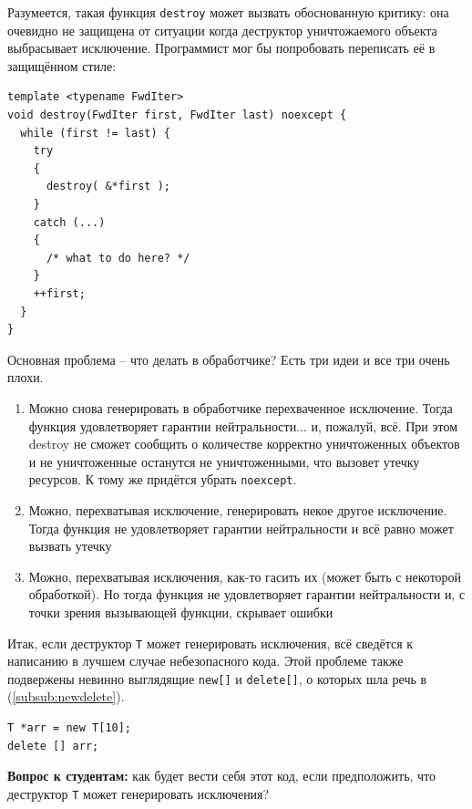 \documentclass[a4paper,12pt,oneside]{book}
\newif\ifanswers
\begin{document}
Разумеется, такая функция \lstinline!destroy! может вызвать обоснованную критику: она очевидно не защищена от ситуации когда деструктор уничтожаемого объекта выбрасывает исключение. Программист мог бы попробовать переписать её в защищённом стиле:

\begin{lstlisting}
template <typename FwdIter>
void destroy(FwdIter first, FwdIter last) noexcept {
  while (first != last) {
    try 
    {
      destroy( &*first ); 
    }
    catch (...)
    {
      /* what to do here? */
    }
    ++first;
  }
}
\end{lstlisting}

Основная проблема -- что делать в обработчике? Есть три идеи и все три очень плохи.
\begin{enumerate}
\item
Можно снова генерировать в обработчике перехваченное исключение. Тогда функция удовлетворяет гарантии нейтральности... и, пожалуй, всё. При этом destroy не сможет сообщить о количестве корректно уничтоженных объектов и не уничтоженные останутся не уничтоженными, что вызовет утечку ресурсов. К тому же придётся убрать \lstinline!noexcept!.
\item
Можно, перехватывая исключение, генерировать некое другое исключение. Тогда функция не удовлетворяет гарантии нейтральности и всё равно может вызвать утечку
\item
Можно, перехватывая исключения, как-то гасить их (может быть с некоторой обработкой). Но тогда функция не удовлетворяет гарантии нейтральности и, с точки зрения вызывающей функции, скрывает ошибки
\end{enumerate}

Итак, если деструктор \lstinline!T! может генерировать исключения, всё сведётся к написанию в лучшем случае небезопасного кода. Этой проблеме также подвержены невинно выглядящие \lstinline!new[]! и \lstinline!delete[]!, о которых шла речь в (\ref{subsub:newdelete}).

\begin{lstlisting}
T *arr = new T[10];
delete [] arr;
\end{lstlisting}

\textbf{Вопрос к студентам:} как будет вести себя этот код, если предположить, что деструктор \lstinline!T! может генерировать исключения?

\ifanswers
Правильный ответ: всё будет очень плохо, так как \lstinline!delete[]! считает количество объектов и начнёт уничтожать их один за другим, наткнётся на исключение в середине и в итоге много памяти может утечь.
\fi
\end{document}
